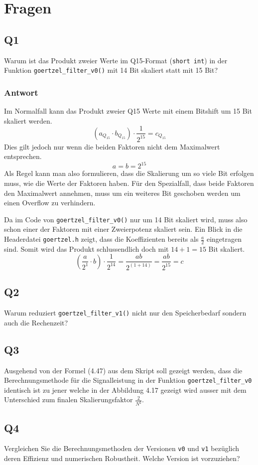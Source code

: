\section{Fragen}

\subsection{Q1}

Warum ist das Produkt zweier Werte im Q15-Format (\lstinline{short int}) in
der Funktion \lstinline{goertzel_filter_v0()} mit 14 Bit skaliert statt mit
15 Bit?

\subsubsection*{Antwort}
Im Normalfall kann das Produkt zweier Q15 Werte mit einem Bitshift um 15 Bit
skaliert werden.
\[ 
	( a_{Q_{15}} \cdot b_{Q_{15}}) \cdot \frac{1}{2^{15}} = c_{Q_{15}}
\]
Dies gilt jedoch nur wenn die beiden Faktoren nicht dem Maximalwert
entsprechen.
\[
	a = b = 2^{15}
\]
Als Regel kann man also formulieren, dass die Skalierung um so viele Bit
erfolgen muss, wie die Werte der Faktoren haben. Für den Spezialfall, dass
beide Faktoren den Maximalwert annehmen, muss um ein weiteres Bit geschoben
werden um einen Overflow zu verhindern.

Da im Code von \lstinline{goertzel_filter_v0()} nur um 14 Bit skaliert wird,
muss also schon einer der Faktoren mit einer Zweierpotenz skaliert sein.
Ein Blick in die Headerdatei \lstinline{goertzel.h} zeigt, dass die
Koeffizienten bereits als $\frac{a}{2}$ eingetragen sind. Somit wird das
Produkt schlussendlich doch mit $14+1=15$ Bit skaliert.
\[
	\left( \frac{a}{2^1} \cdot b \right) \cdot \frac{1}{2^{14}}
	= \frac{a b}{2^{(1+14)}}
	= \frac{a b}{2^{15}}
	= c
\]

\subsection{Q2}

Warum reduziert \lstinline{goertzel_filter_v1()} nicht nur den Speicherbedarf
sondern auch die Rechenzeit?

\subsection{Q3}

Ausgehend von der Formel (4.47) aus dem Skript soll gezeigt werden, dass die
Berechnungsmethode für die Signalleistung in der Funktion
\lstinline{goertzel_filter_v0} identisch ist zu jener welche in der Abbildung
4.17 gezeigt wird ausser mit dem Unterschied zum finalen Skalierungsfaktor 
$\frac{2}{N^2}$.

\subsection{Q4}

Vergleichen Sie die Berechnungsmethoden der Versionen \lstinline{v0} und
\lstinline{v1} bezüglich deren Effizienz und numerischen Robustheit.
Welche Version ist vorzuziehen?
